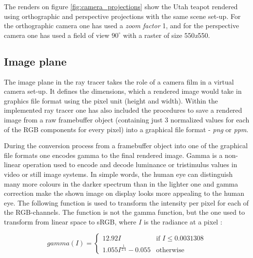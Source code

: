 \documentclass{article}
\begin{document}
The renders on figure \ref{fig:camera_projections} show the Utah teapot rendered using orthographic and perspective projections with the same scene set-up. For the orthographic camera one has used a \textit{zoom factor} 1, and for the perspective camera one has used a field of view $90^{\circ}$ with a raster of size 550\textit{x}550. 

\subsection{Image plane}
The image plane in the ray tracer takes the role of a camera film in a virtual camera set-up. It defines the dimensions, which a rendered image would take in graphics file format using the pixel unit (height and width). Within the implemented ray tracer one has also included the procedures to save a rendered image from a raw framebuffer object (containing just 3 normalized values for each of the RGB components for every pixel) into a graphical file format - \textit{png} or \textit{ppm}.

\vspace*{\baselineskip}

During the conversion process from a framebuffer object into one of the graphical file formats one encodes gamma to the final rendered image. Gamma is a non-linear operation used to encode and decode luminance or tristimulus values in video or still image systems. \cite{gamma1} In simple words, the human eye can distinguish many more colours in the darker spectrum than in the lighter one and gamma correction make the shown image on display looks more appealing to the human eye. The following function is used to transform the intensity per pixel for each of the RGB-channels. The function is not the gamma function, but the one used to transform from linear space to sRGB, where $I$ is the radiance at a pixel \cite{gamma2}:

\[ 
	gamma(I) = 
	\begin{cases}
	12.92I 										& \text{if $I \leq 0.0031308$} \\
	1.055I^{\frac{1}{2.4}} - 0.055 	& \text{otherwise}
	\end{cases}
\]
\end{document}
